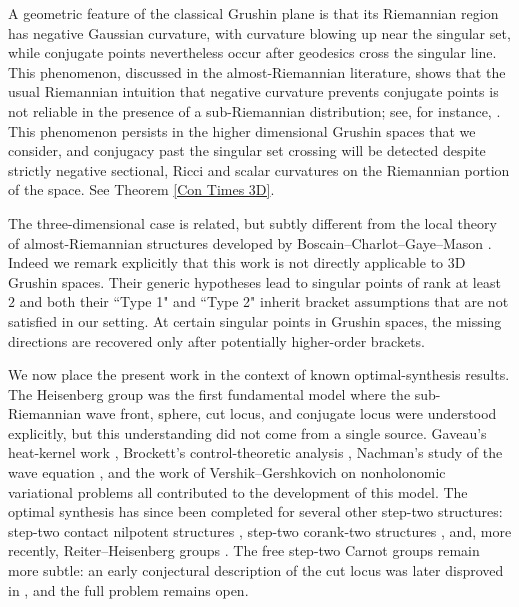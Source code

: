 \documentclass[12pt]{amsart}
\numberwithin{equation}{section}
\theoremstyle{plain}
\theoremstyle{definition}
\theoremstyle{remark}
\begin{document}
A geometric feature of the classical Grushin plane is that its Riemannian region has
negative Gaussian curvature, with curvature blowing up near the singular set, while
conjugate points nevertheless occur after geodesics cross the singular line. This
phenomenon, discussed in the almost-Riemannian literature, shows that the usual
Riemannian intuition that negative curvature prevents conjugate points is not reliable
in the presence of a sub-Riemannian distribution; see, for instance,
\cite{AgrachevBoscainSigalotti2008,BoscainLaurent2013}. This phenomenon persists in the higher dimensional Grushin spaces that we consider, and conjugacy past the singular set crossing will be detected despite strictly negative sectional, Ricci and scalar curvatures on the Riemannian portion of the space. See Theorem \ref{Con Times 3D}.

The three-dimensional case is related, but subtly different from the local theory of almost-Riemannian
structures developed by Boscain--Charlot--Gaye--Mason
\cite{BoscainCharlotGayeMason2015}. Indeed we remark explicitly that this work is not directly applicable to 3D Grushin spaces. Their generic
hypotheses lead to singular points of rank at least \(2\) and both their ``Type 1" and ``Type 2" inherit bracket assumptions that are not satisfied in our setting. At certain singular points in Grushin spaces, the missing directions are
recovered only after potentially higher-order brackets.

We now place the present work in the context of known optimal-synthesis results. The
Heisenberg group was the first fundamental model where the sub-Riemannian wave front,
sphere, cut locus, and conjugate locus were understood explicitly, but this understanding
did not come from a single source. Gaveau's heat-kernel work \cite{Gaveau1977a},
Brockett's control-theoretic analysis \cite{Brockett1982}, Nachman's study of the wave
equation \cite{Nachman1982}, and the work of Vershik--Gershkovich on nonholonomic
variational problems \cite{VershikGershkovich1988} all contributed to the development of
this model. The optimal synthesis has since been completed for several other step-two
structures: step-two contact nilpotent structures \cite{AgrachevBarilariBoscain2012},
step-two corank-two structures \cite{BarilariBoscainGauthier2012}, and, more recently,
Reiter--Heisenberg groups \cite{MontanariMorbidelli2024}. The free step-two Carnot
groups remain more subtle: an early conjectural description of the cut locus
\cite{Myasnichenko2002, Myasnichenko2006, Monroy-PerezAnzaldo-Meneses2006} was later
disproved in \cite{RizziSerres2017}, and the full problem remains open.
\end{document}
